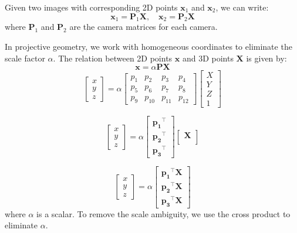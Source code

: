 Given two images with corresponding 2D points \( \mathbf{x}_1 \) and \( \mathbf{x}_2 \), we can write:
\[
	\mathbf{x}_1 = \mathbf{P}_1 \mathbf{X}, \quad \mathbf{x}_2 = \mathbf{P}_2 \mathbf{X}
\]
where \( \mathbf{P}_1 \) and \( \mathbf{P}_2 \) are the camera matrices for each camera.


In projective geometry, we work with homogeneous coordinates to eliminate the scale factor \( \alpha \). The relation between 2D points \( \mathbf{x} \) and 3D points \( \mathbf{X} \) is given by:
\[
	\mathbf{x} = \alpha \mathbf{P} \mathbf{X}
\]
\[
	\begin{bmatrix} x \\ y \\ z \end{bmatrix} = \alpha \begin{bmatrix} p_1 & p_2 & p_3 & p_4 \\ p_5 & p_6 & p_7 & p_8 \\ p_9 & p_{10} & p_{11} & p_{12} \end{bmatrix} \begin{bmatrix} X \\ Y \\ Z \\ 1 \end{bmatrix}
\]

\[
	\begin{bmatrix} x \\ y \\ z \end{bmatrix} = \alpha \begin{bmatrix} \mathbf{p_1}^{\top} \\ \mathbf{p_2}^{\top} \\ \mathbf{p_3}^{\top} \end{bmatrix} \begin{bmatrix} \mathbf{X} \\  \end{bmatrix}
\]

\[
	\begin{bmatrix} x \\ y \\ z \end{bmatrix} = \alpha \begin{bmatrix} \mathbf{p_1}^{\top} \mathbf{X} \\ \mathbf{p_2}^{\top} \mathbf{X} \\ \mathbf{p_3}^{\top} \mathbf{X} \end{bmatrix}
\]
where \( \alpha \) is a scalar. To remove the scale ambiguity, we use the cross product to eliminate \( \alpha \).

